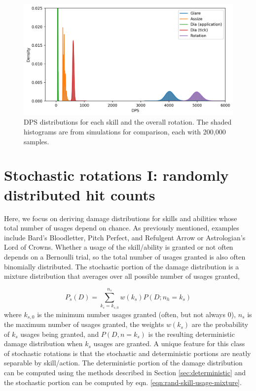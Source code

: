 \documentclass{article}
\begin{document}
    \begin{figure}[H]
        \centering
        \includegraphics[width=0.95\linewidth]{img/deterministic-rotation.png}
        \caption{DPS distributions for each skill and the overall rotation. The shaded histograms are from simulations for comparison, each with 200,000 samples.}\label{fig:deterministic-rotation}
    \end{figure}
    \newpage
    \section{Stochastic rotations I: randomly distributed hit counts}
    Here, we focus on deriving damage distributions for skills and abilities whose total number of usages depend on chance. As previously mentioned, examples include Bard's Bloodletter, Pitch Perfect, and Refulgent Arrow or Astrologian's Lord of Crowns. Whether a usage of the skill/ability is granted or not often depends on a Bernoulli trial, so the total number of usages granted is also often binomially distributed. The stochastic portion of the damage distribution is a mixture distribution that averages over all possible number of usages granted,

    \begin{equation}\label{eqn:rand-skill-usage-mixture}
        P_s(D) = \sum_{k_s = k_{s,0}}^{n_s} w(k_s) P(D; n_h = k_s)  
    \end{equation}
    where $k_{s,0}$ is the minimum number usages granted (often, but not always 0), $n_s$ is the maximum number of usages granted, the weights $w(k_s)$ are the probability of $k_s$ usages being granted, and $P(D, n=k_s)$ is the resulting deterministic damage distribution when $k_s$ usages are granted. A unique feature for this class of stochastic rotations is that the stochastic and deterministic portions are neatly separable by skill/action. The deterministic portion of the damage distribution can be computed using the methods described in Section \ref{sec:deterministic} and the stochastic portion can be computed by eqn. \ref{eqn:rand-skill-usage-mixture}.
\end{document}
